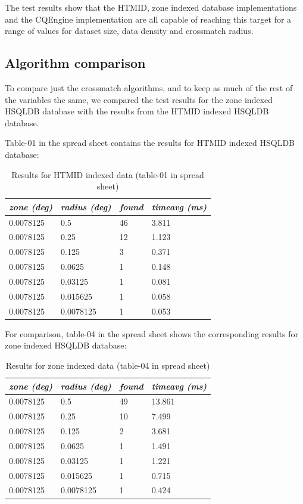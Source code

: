 \documentclass{article}
\newcommand{\hsqldb} {HSQLDB\xspace}
\newcommand{\cqengine} {CQEngine\xspace}
\newcommand{\htmid} {HTMID\xspace}
\newcommand{\crossmatch} {crossmatch\xspace}
\newcommand{\dataset} {dataset\xspace}
\begin{document}
The test results show that the \htmid, zone indexed database implementations and the \cqengine implementation are all capable of reaching this target for a range of values for \dataset size, data density and \crossmatch radius.

\subsection{Algorithm comparison}
\label{algorithm-comparison}

To compare just the \crossmatch algorithms, and to keep as much of the rest of the variables the same, we compared the test results for the zone indexed \hsqldb database with the results from the \htmid indexed \hsqldb database.

Table-01 in the spread sheet contains the results for \htmid indexed \hsqldb database:

\begin{table}[H]
\centering
\begin{tabular}{|l|l|l|l|}
\hline
\textit{zone (deg)} & \textit{radius (deg)} & \textit{found} & \textit{timeavg (ms)} \\ \hline
0.0078125 & 0.5       & 46 & 3.811 \\ \hline
0.0078125 & 0.25      & 12 & 1.123 \\ \hline
0.0078125 & 0.125     &  3 & 0.371 \\ \hline
0.0078125 & 0.0625    &  1 & 0.148 \\ \hline
0.0078125 & 0.03125   &  1 & 0.081 \\ \hline
0.0078125 & 0.015625  &  1 & 0.058 \\ \hline
0.0078125 & 0.0078125 &  1 & 0.053 \\ \hline
\end{tabular}
\caption{Results for \htmid indexed data (table-01 in spread sheet)}
\label{tab:htmid-results}
\end{table}

For comparison, table-04 in the spread sheet shows the corresponding results for zone indexed \hsqldb database:

\begin{table}[H]
\centering
\begin{tabular}{|l|l|l|l|}
\hline
\textit{zone (deg)} & \textit{radius (deg)} & \textit{found} & \textit{timeavg (ms)} \\ \hline
0.0078125 & 0.5       & 49 & 13.861 \\ \hline
0.0078125 & 0.25      & 10 &  7.499 \\ \hline
0.0078125 & 0.125     &  2 &  3.681 \\ \hline
0.0078125 & 0.0625    &  1 &  1.491 \\ \hline
0.0078125 & 0.03125   &  1 &  1.221 \\ \hline
0.0078125 & 0.015625  &  1 &  0.715 \\ \hline
0.0078125 & 0.0078125 &  1 &  0.424 \\ \hline
\end{tabular}
\caption{Results for zone indexed data (table-04 in spread sheet)}
\label{tab:zone-results}
\end{table}
\end{document}
